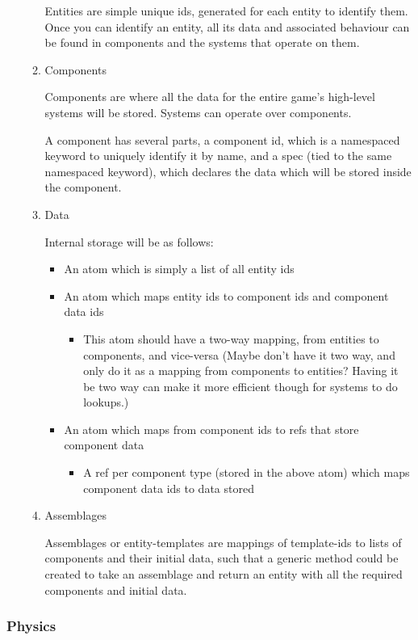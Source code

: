 \documentclass[11pt]{article}
\begin{document}
\begin{enumerate}
\begin{enumerate}
Entities are simple unique ids, generated for each entity to identify them. Once you can
identify an entity, all its data and associated behaviour can be found in components and
the systems that operate on them.
\item Components
\label{sec:orgf4c4cc5}

Components are where all the data for the entire game's high-level systems will be stored.
Systems can operate over components.

A component has several parts,  a component id, which is a namespaced keyword to uniquely
identify it by name, and a spec (tied to the same namespaced keyword), which declares the
data which will be stored inside the component.
\item Data
\label{sec:orgff78f3e}

Internal storage will be as follows:
\begin{itemize}
\item An atom which is simply a list of all entity ids
\item An atom which maps entity ids to component ids and component data ids
\begin{itemize}
\item This atom should have a two-way mapping, from entities to components, and vice-versa
(Maybe don't have it two way, and only do it as a mapping from components to entities?
 Having it be two way can make it more efficient though for systems to do lookups.)
\end{itemize}
\item An atom which maps from component ids to refs that store component data
\begin{itemize}
\item A ref per component type (stored in the above atom) which maps component data ids to data stored
\end{itemize}
\end{itemize}
\item Assemblages
\label{sec:org9856d5b}

Assemblages or entity-templates are mappings of template-ids to lists of components and their initial
data, such that a generic method could be created to take an assemblage and return an entity with all
the required components and initial data.
\end{enumerate}
\end{enumerate}

\subsubsection{Physics}
\label{sec:orgab6b3a5}
\end{document}
